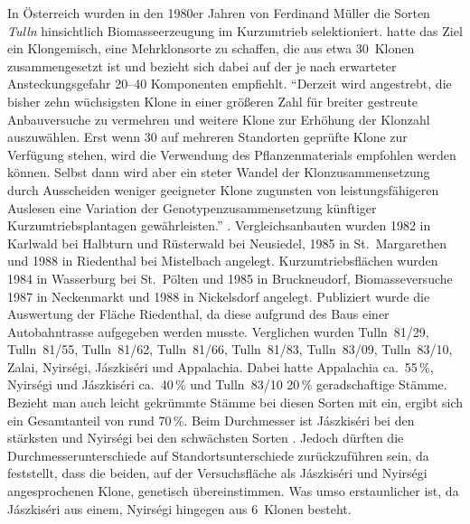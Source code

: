 \documentclass[twocolumn]{scrartcl}
\begin{document}
In Österreich wurden in den 1980er Jahren von Ferdinand Müller die
Sorten \emph{Tulln} hinsichtlich Biomasseerzeugung im Kurzumtrieb
selektioniert. \cite{mueller1999robinie} hatte das Ziel ein
Klongemisch, eine Mehrklonsorte zu schaffen, die aus etwa 30~Klonen
zusammengesetzt ist und bezieht sich dabei auf
\cite{huehn1986klonanazahl} der je nach erwarteter Ansteckungsgefahr
20--40 Komponenten empfiehlt.
\enquote{Derzeit wird angestrebt, die bisher zehn wüchsigsten Klone in
  einer größeren Zahl für breiter gestreute Anbauversuche zu vermehren
  und weitere Klone zur Erhöhung der Klonzahl auszuwählen. Erst wenn
  30 auf mehreren Standorten geprüfte Klone zur Verfügung stehen, wird
  die Verwendung des Pflanzenmaterials empfohlen werden können. Selbst
  dann wird aber ein steter Wandel der Klonzusammensetzung durch
  Ausscheiden weniger geeigneter Klone zugunsten von
  leistungsfähigeren Auslesen eine Variation der
  Genotypenzusammensetzung künftiger Kurzumtriebsplantagen
  gewährleisten.} \citep{mueller1999robinie}.
Vergleichsanbauten wurden 1982 in Karlwald bei Halbturn
und Rüsterwald bei Neusiedel, 1985 in St.~Margarethen und 1988 in
Riedenthal bei Mistelbach angelegt. Kurzumtriebsflächen wurden 1984 in
Wasserburg bei St.~Pölten und 1985 in Bruckneudorf, Biomasseversuche
1987 in Neckenmarkt und 1988 in Nickelsdorf angelegt. Publiziert
wurde die Auswertung der Fläche Riedenthal, da diese aufgrund des Baus
einer Autobahntrasse aufgegeben werden musste. Verglichen wurden
Tulln~81/29, Tulln~81/55, Tulln~81/62, Tulln~81/66, Tulln~81/83,
Tulln~83/09, Tulln~83/10, Zalai, Nyirségi, Jászkiséri und
Appalachia. Dabei hatte Appalachia ca.\ 55\,\%, Nyirségi und
Jászkiséri ca.\ 40\,\% und Tulln~83/10 20\,\% geradschaftige Stämme.
Bezieht man auch leicht gekrümmte Stämme bei diesen Sorten mit ein, ergibt sich ein Gesamtanteil von rund 70\,\%.
Beim Durchmesser ist Jászkiséri bei den stärksten
und Nyirségi bei den schwächsten Sorten
\citep{schueler2006robinie}. Jedoch dürften die
Durchmesserunterschiede auf Standortsunterschiede zurückzuführen sein,
da \cite{heinze2014robinie} feststellt, dass die beiden, auf der
Versuchsfläche als Jászkiséri und Nyirségi angesprochenen Klone,
genetisch übereinstimmen. Was umso erstaunlicher ist, da
Jászkiséri aus einem, Nyirségi hingegen aus
6~Klonen besteht.
\end{document}
